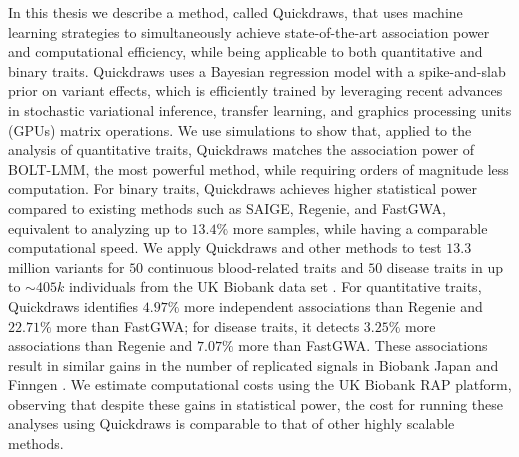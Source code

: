 %
In this thesis we describe a method, called Quickdraws, that uses machine learning strategies to simultaneously achieve state-of-the-art association power and computational efficiency, while being applicable to both quantitative and binary traits.
%
%
Quickdraws uses a Bayesian regression model with a spike-and-slab prior on variant effects, which is efficiently trained by leveraging recent advances in stochastic variational inference, transfer learning, and graphics processing units (GPUs) matrix operations.
%
We use simulations to show that, applied to the analysis of quantitative traits, Quickdraws matches the association power of BOLT-LMM, the most powerful method, while requiring orders of magnitude less computation. 
%
For binary traits, Quickdraws achieves higher statistical power compared to existing methods such as SAIGE, Regenie, and FastGWA, equivalent to analyzing up to $13.4\%$ more samples, while having a comparable computational speed.
%
We apply Quickdraws and other methods to test $13.3$ million variants for $50$ continuous blood-related traits and $50$ disease traits in up to ${\sim}405k$ individuals from the UK Biobank data set \cite{Bycroft2018}.
%
For quantitative traits, Quickdraws identifies $4.97\%$ more independent associations than Regenie and $22.71\%$ more than FastGWA; for disease traits, it detects $3.25\%$ more associations than Regenie and $7.07\%$ more than FastGWA.
%
These associations result in similar gains in the number of replicated signals in Biobank Japan \cite{nagai2017overview} and Finngen \cite{kurki2023finngen}.
%
We estimate computational costs using the UK Biobank RAP platform, observing that despite these gains in statistical power, the cost for running these analyses using Quickdraws is comparable to that of other highly scalable methods.

